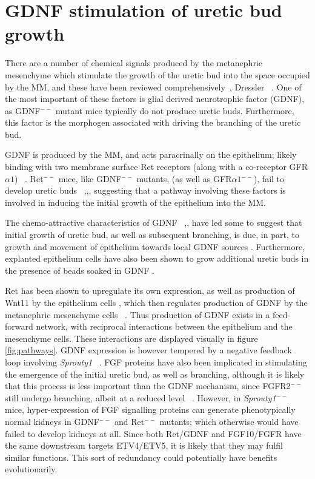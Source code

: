 \documentclass[pdftex,10pt,a4paper,twocolumn]{article}
\begin{document}
\section{GDNF stimulation of uretic bud growth}
There are a number of chemical signals produced by the metanephric mesenchyme which stimulate the growth of the uretic bud into the space occupied by the MM, and these have been reviewed comprehensively~\cite{costantini2006gdnf}, Dressler ~\cite{dressler2006cellular}. One of the most important of these factors is glial derived neurotrophic factor (GDNF), as GDNF$^{--}$ mutant mice typically do not produce uretic buds. Furthermore, this factor is the morphogen associated with driving the branching of the uretic bud.

GDNF is produced by the MM, and acts paracrinally on the epithelium; likely binding with two membrane surface Ret receptors (along with a co-receptor GFR$\alpha 1$) ~\cite{MenshykauDIber}. Ret$^{--}$ mice, like GDNF$^{--}$ mutants, (as well as GFR$\alpha 1$$^{--}$), fail to develop uretic buds ~\cite{CostantiniFKopan2010},\cite{majumdar2003wnt11},\cite{treanor1996characterization}, suggesting that a pathway involving these factors is involved in inducing the initial growth of the epithelium into the MM.

The chemo-attractive characteristics of GDNF ~\cite{tang2002ureteric},\cite{tang1998ret}, have led some to suggest that initial growth of uretic bud, as well as subsequent branching, is due, in part, to growth and movement of epithelium towards local GDNF sources \cite{sariola2003novel}. Furthermore, explanted epithelium cells have also been shown to grow additional uretic buds in the presence of beads soaked in GDNF \cite{pepicelli1997gdnf}. 

Ret has been shown to upregulate its own expression, as well as production of Wnt11 by the epithelium cells \cite{pepicelli1997gdnf}, which then regulates production of GDNF by the metanephric mesenchyme cells ~\cite{majumdar2003wnt11}. Thus production of GDNF exists in a feed-forward network, with reciprocal interactions between the epithelium and the mesenchyme cells. These interactions are displayed visually in figure \ref{fig:pathways}. GDNF expression is however tempered by a negative feedback loop involving \textit{Sprouty1} ~\cite{basson2005sprouty1}. FGF proteins have also been implicated in stimulating the emergence of the initial uretic bud, as well as branching, although it is likely that this process is less important than the GDNF mechanism, since FGFR2${^{--}}$ still undergo branching, albeit at a reduced level ~\cite{sims2009three}. However, in \textit{Sprouty1}${^{--}}$ mice, hyper-expression of FGF signalling proteins can generate phenotypically normal kidneys in GDNF$^{--}$ and Ret$^{--}$ mutants; which otherwise would have failed to develop kidneys at all. Since both Ret/GDNF and FGF10/FGFR have the same downstream targets ETV4/ETV5, it is likely that they may fulfil similar functions. This sort of redundancy could potentially have benefits evolutionarily.
\end{document}
